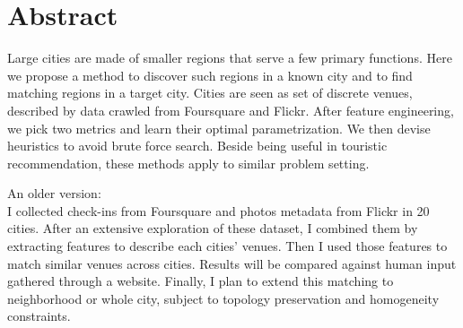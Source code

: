\begingroup
\let\clearpage\relax
\let\cleardoublepage\relax
\let\cleardoublepage\relax

\chapter*{Abstract}

Large cities are made of smaller regions that serve a few primary functions.
Here we propose a method to discover such regions in a known city and to find
matching regions in a target city. Cities are seen as set of discrete venues,
described by data crawled from Foursquare and Flickr. After feature
engineering, we pick two metrics and learn their optimal parametrization. We
then devise heuristics to avoid brute force search. Beside being useful in
touristic recommendation, these methods apply to similar problem setting.

\begin{comments}
An older version:\\
I collected check-ins from Foursquare and photos metadata from Flickr in 20
cities. After an extensive exploration of these dataset, I combined them by
extracting features to describe each cities' venues. Then I used those
features to match similar venues across cities. Results will be compared
against human input gathered through a website. Finally, I plan to extend this
matching to neighborhood or whole city, subject to topology preservation and
homogeneity constraints.
\end{comments}

\endgroup 

\vfill
